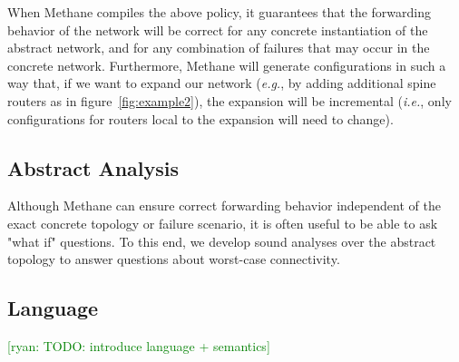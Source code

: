 \documentclass{sig-alternate-10pt}
\newcommand{\ryan}[1]{\textcolor{green}{[ryan: #1]}}
\newcommand{\EG}{\emph{e.g.}}
\newcommand{\IE}{\emph{i.e.}}
\newcommand{\sysname}{{\small \sf Methane}\xspace}
\begin{document}
When \sysname compiles the above policy, it guarantees that the forwarding behavior
of the network will be correct for any concrete instantiation of the abstract network,
and for any combination of failures that may occur in the concrete network.
Furthermore, \sysname will generate configurations in such a way that,
if we want to expand our network (\EG, by adding additional spine routers as in
figure~\ref{fig:example2}), the expansion will be incremental (\IE, only
configurations for routers local to the expansion will need to change).

\subsection{Abstract Analysis}

Although \sysname can ensure correct forwarding behavior independent of the
exact concrete topology or failure scenario, it is often useful to be able
to ask "what if" questions. To this end, we develop sound analyses over the
abstract topology to answer questions about worst-case connectivity.



\subsection{Language}

\ryan{TODO: introduce language + semantics}

\newcommand{\BNFALT}{\;\;|\;\;}
\newcommand{\hdr}[2]{\flushleft \chdr{\hspace{5mm}#1}{#2}}
\newcommand{\chdr}[2]{\textbf{#1} {#2} \\ \centering}%
\end{document}
